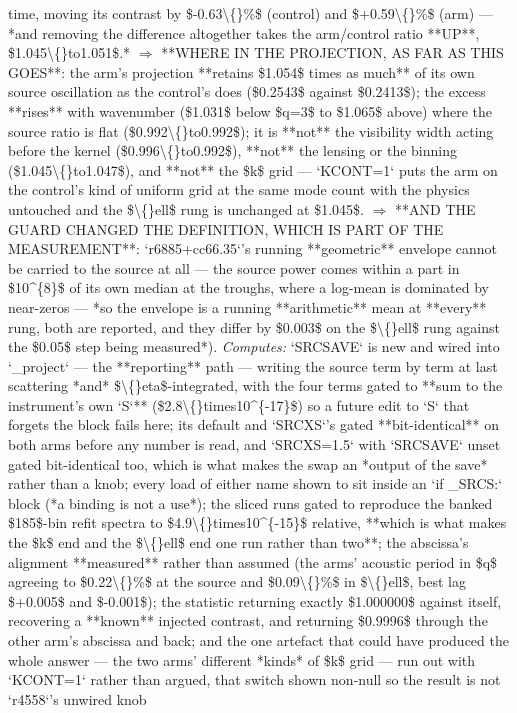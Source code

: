 \begin{description}
time, moving its contrast by \$-0.63\textbackslash\{\}\%\$ (control) and \$+0.59\textbackslash\{\}\%\$ (arm) --- *and removing the difference altogether takes the arm/control ratio **UP**, \$1.045\textbackslash\{\}to1.051\$.* \ensuremath{\Rightarrow}  **WHERE IN THE PROJECTION, AS FAR AS THIS GOES**: the arm's projection **retains \$1.054\$ times as much** of its own source oscillation as the control's does (\$0.2543\$ against \$0.2413\$); the excess **rises** with wavenumber (\$1.031\$ below \$q=3\$ to \$1.065\$ above) where the source ratio is flat (\$0.992\textbackslash\{\}to0.992\$); it is **not** the visibility width acting before the kernel (\$0.996\textbackslash\{\}to0.992\$), **not** the lensing or the binning (\$1.045\textbackslash\{\}to1.047\$), and **not** the \$k\$ grid --- `KCONT=1` puts the arm on the control's kind of uniform grid at the same mode count with the physics untouched and the \$\textbackslash\{\}ell\$ rung is unchanged at \$1.045\$. \ensuremath{\Rightarrow}  **AND THE GUARD CHANGED THE DEFINITION, WHICH IS PART OF THE MEASUREMENT**: `r6885+cc66.35`'s running **geometric** envelope cannot be carried to the source at all --- the source power comes within a part in \$10\textasciicircum{}\{8\}\$ of its own median at the troughs, where a log-mean is dominated by near-zeros --- *so the envelope is a running **arithmetic** mean at **every** rung, both are reported, and they differ by \$0.003\$ on the \$\textbackslash\{\}ell\$ rung against the \$0.05\$ step being measured*). 
\emph{Computes:} `SRCSAVE` is new and wired into `\_project` --- the **reporting** path --- writing the source term by term at last scattering *and* \$\textbackslash\{\}eta\$-integrated, with the four terms gated to **sum to the instrument's own `S`** (\$2.8\textbackslash\{\}times10\textasciicircum{}\{-17\}\$) so a future edit to `S` that forgets the block fails here; its default and `SRCXS`'s gated **bit-identical** on both arms before any number is read, and `SRCXS=1.5` with `SRCSAVE` unset gated bit-identical too, which is what makes the swap an *output of the save* rather than a knob; every load of either name shown to sit inside an `if \_SRCS:` block (*a binding is not a use*); the sliced runs gated to reproduce the banked \$185\$-bin refit spectra to \$4.9\textbackslash\{\}times10\textasciicircum{}\{-15\}\$ relative, **which is what makes the \$k\$ end and the \$\textbackslash\{\}ell\$ end one run rather than two**; the abscissa's alignment **measured** rather than assumed (the arms' acoustic period in \$q\$ agreeing to \$0.22\textbackslash\{\}\%\$ at the source and \$0.09\textbackslash\{\}\%\$ in \$\textbackslash\{\}ell\$, best lag \$+0.005\$ and \$-0.001\$); the statistic returning exactly \$1.000000\$ against itself, recovering a **known** injected contrast, and returning \$0.9996\$ through the other arm's abscissa and back; and the one artefact that could have produced the whole answer --- the two arms' different *kinds* of \$k\$ grid --- run out with `KCONT=1` rather than argued, that switch shown non-null so the result is not `r4558`'s unwired knob

\end{description}
